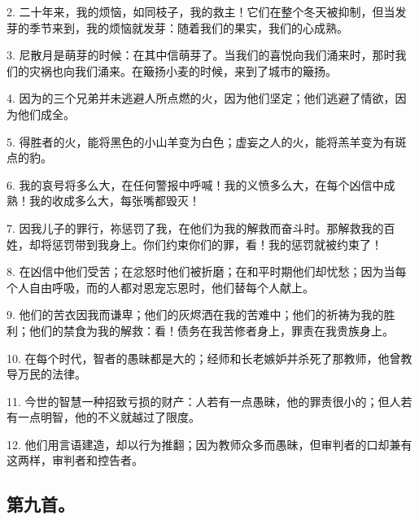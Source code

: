 2. 二十年来，我的烦恼，如同枝子，我的救主！它们在整个冬天被抑制，但当发芽的季节来到，我的烦恼就发芽：随着我们的果实，我们的心成熟。\par

3. 尼散月是萌芽的时候：在其中信萌芽了。当我们的喜悦向我们涌来时，那时我们的灾祸也向我们涌来。在簸扬小麦的时候，来到了城市的簸扬。\par

4. 因为的三个兄弟并未逃避人所点燃的火，因为他们坚定；他们逃避了情欲，因为他们成全。\par

5. 得胜者的火，能将黑色的小山羊变为白色；虚妄之人的火，能将羔羊变为有斑点的豹。\par

6. 我的哀号将多么大，在任何警报中呼喊！我的义愤多么大，在每个凶信中成熟！我的收成多么大，每张嘴都毁灭！\par

7. 因我儿子的罪行，祢惩罚了我，在他们为我的解救而奋斗时。那解救我的百姓，却将惩罚带到我身上。你们约束你们的罪，看！我的惩罚就被约束了！\par

8. 在凶信中他们受苦；在忿怒时他们被折磨；在和平时期他们却忧愁；因为当每个人自由呼吸，而的人都对恩宠忘恩时，他们替每个人献上。\par

9. 他们的苦衣因我而谦卑；他们的灰烬洒在我的苦难中；他们的祈祷为我的胜利；他们的禁食为我的解救：看！债务在我苦修者身上，罪责在我贵族身上。\par

10. 在每个时代，智者的愚昧都是大的；经师和长老嫉妒并杀死了那教师，他曾教导万民的法律。\par

11. 今世的智慧一种招致亏损的财产：人若有一点愚昧，他的罪责很小的；但人若有一点明智，他的不义就越过了限度。\par

12. 他们用言语建造，却以行为推翻；因为教师众多而愚昧，但审判者的口却兼有这两样，审判者和控告者。\par

\par


\subsection{第九首。}

